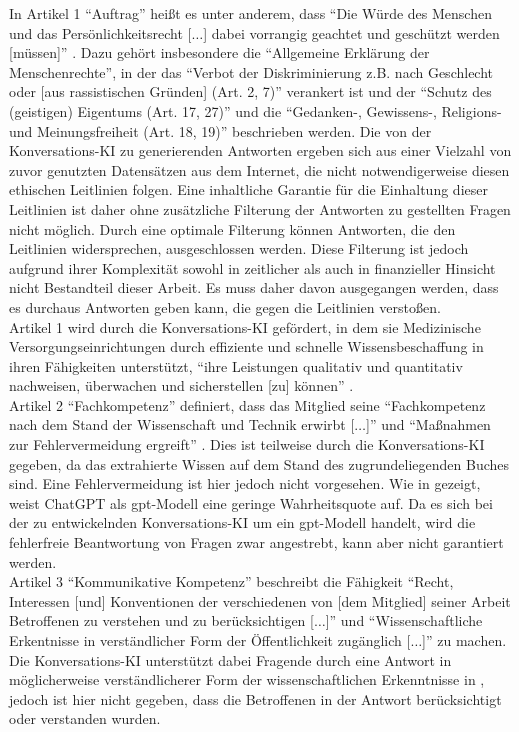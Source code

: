In Artikel 1 \enquote{Auftrag} heißt es unter anderem, dass
\enquote{Die Würde des Menschen und das Persönlichkeitsrecht [$\dots$] dabei vorrangig geachtet und geschützt werden [müssen]} \citep{gmds_eth}.
Dazu gehört insbesondere die \enquote{Allgemeine Erklärung der Menschenrechte},
in der das \enquote{Verbot der Diskriminierung z.B. nach Geschlecht oder [aus rassistischen Gründen] (Art. 2, 7)}
verankert ist und
der \enquote{Schutz des (geistigen) Eigentums (Art. 17, 27)} und die \enquote{Gedanken-, Gewissens-, Religions- und Meinungsfreiheit (Art. 18, 19)} beschrieben werden.
Die von der Konversations-KI zu generierenden Antworten ergeben sich aus einer Vielzahl von zuvor genutzten Datensätzen aus dem Internet, die nicht notwendigerweise diesen ethischen Leitlinien folgen.
Eine inhaltliche Garantie für die Einhaltung dieser Leitlinien ist daher ohne zusätzliche Filterung der Antworten zu gestellten Fragen nicht möglich.
Durch eine optimale Filterung können Antworten, die den Leitlinien widersprechen, ausgeschlossen werden.
Diese Filterung ist jedoch aufgrund ihrer Komplexität sowohl in zeitlicher als auch in finanzieller Hinsicht nicht Bestandteil dieser Arbeit.
Es muss daher davon ausgegangen werden, dass es durchaus Antworten geben kann, die gegen die Leitlinien verstoßen.\\

Artikel 1 wird durch die Konversations-KI gefördert, in dem sie Medizinische Versorgungseinrichtungen durch effiziente und schnelle Wissensbeschaffung in ihren Fähigkeiten unterstützt,
\enquote{ihre Leistungen qualitativ und quantitativ nachweisen, überwachen und sicherstellen [zu] können} \citep{gmds_eth}.\\

Artikel 2 \enquote{Fachkompetenz} definiert, dass das Mitglied seine \enquote{Fachkompetenz nach dem Stand der Wissenschaft und Technik erwirbt [$\dots$]} und \enquote{Maßnahmen zur Fehlervermeidung ergreift} \citep{gmds_eth}.
Dies ist teilweise durch die Konversations-KI gegeben, da das extrahierte Wissen auf dem Stand des zugrundeliegenden Buches \citet{bb} sind.
Eine Fehlervermeidung ist hier jedoch nicht vorgesehen.
Wie in \citet{chatgpt_qas} gezeigt, weist ChatGPT als \ac{gpt}-Modell eine geringe Wahrheitsquote auf.
Da es sich bei der zu entwickelnden Konversations-KI um ein \ac{gpt}-Modell handelt, wird die fehlerfreie Beantwortung von Fragen zwar angestrebt, kann aber nicht garantiert werden.\\

Artikel 3 \enquote{Kommunikative Kompetenz} beschreibt die Fähigkeit
\enquote{Recht, Interessen [und] Konventionen der verschiedenen von [dem Mitglied] seiner Arbeit Betroffenen zu verstehen und zu berücksichtigen [$\dots$]} und
\enquote{Wissenschaftliche Erkentnisse in verständlicher Form der Öffentlichkeit zugänglich [$\dots$]} \citep{gmds_eth} zu machen.
Die Konversations-KI unterstützt dabei Fragende durch eine Antwort in möglicherweise verständlicherer Form der wissenschaftlichen Erkenntnisse in \citet{bb},
jedoch ist hier nicht gegeben, dass die Betroffenen in der Antwort berücksichtigt oder verstanden wurden.\\

